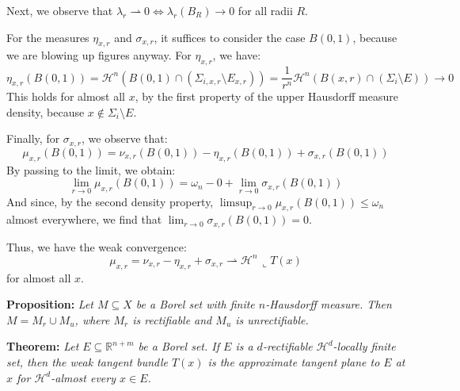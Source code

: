 \vspace{1ex}
Next, we observe that $\lambda_r\rightharpoonup 0\Leftrightarrow \lambda_r(B_R)\rightarrow 0$ for all radii $R$.

\vspace{1ex}
For the measures $\eta_{x,r}$ and $\sigma_{x,r}$, it suffices to consider the case $B(0,1)$, because we are blowing up figures anyway. For $\eta_{x,r}$, we have:
\[\eta_{x,r}(B(0, 1))=\mathcal H^n(B(0, 1)\cap(\Sigma_{i,x,r}\setminus E_{x,r}))=
\frac{1}{r^n}\mathcal H^n(B(x,r)\cap(\Sigma_i\setminus E))\rightarrow 0\]
This holds for almost all $x$, by the first property of the upper Hausdorff measure density, because $x \notin \Sigma_i \setminus E$.

\vspace{1ex}
Finally, for $\sigma_{x,r}$, we observe that:
\[\mu_{x,r}(B(0,1))=\nu_{x,r}(B(0,1))-\eta_{x,r}(B(0,1))+\sigma_{x,r}(B(0,1))\]
By passing to the limit, we obtain:
\[\lim_{r\to 0}\mu_{x,r}(B(0,1))=\omega_n-0+\lim_{r\to 0}\sigma_{x,r}(B(0,1))\]
And since, by the second density property, $\limsup_{r\to 0}\mu_{x,r}(B(0,1)) \le \omega_n$ almost everywhere, we find that $\lim_{r\to 0}\sigma_{x,r}(B(0,1))=0$.

Thus, we have the weak convergence:
\[\mu_{x,r}=\nu_{x,r}-\eta_{x,r}+\sigma_{x,r}\rightharpoonup\mathcal H^n\,\llcorner T(x)\]
for almost all $x$.

\vspace{2ex}
\textbf{Proposition:} \textit{Let $M\subseteq X$ be a Borel set with finite
$n$-Hausdorff measure. Then $M=M_r\cup M_u$, where $M_r$ is rectifiable
and $M_u$ is unrectifiable.}

\vspace{2ex}
\textbf{Theorem:} \textit{Let $E\subseteq\mathbb R^{n+m}$ be a Borel set. If $E$
is a $d$-rectifiable $\mathcal H^d$-locally finite set, then the weak tangent
bundle $T(x)$ is the approximate tangent plane to $E$ at $x$ for $\mathcal H^d$-almost
every $x\in E$.}
